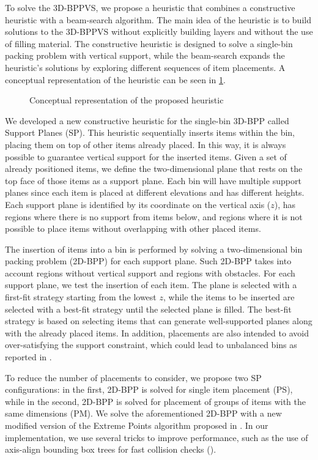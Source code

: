 \documentclass[11pt,a4paper,twocolumn]{article}
\begin{document}
To solve the 3D-BPPVS, we propose a heuristic that combines a constructive heuristic with a beam-search algorithm.
The main idea of the heuristic is to build solutions to the 3D-BPPVS without explicitly building layers and without the use of filling material.
The constructive heuristic is designed to solve a single-bin packing problem with vertical support, while the beam-search expands the heuristic's solutions by exploring different sequences of item placements.
A conceptual representation of the heuristic can be seen in \cref{fig:heur_scheme}.
\begin{figure}[h]
    \resizebox{\columnwidth}{!}{%
    
    }
    \caption{Conceptual representation of the proposed heuristic}
    \label{fig:heur_scheme}
\end{figure}


We developed a new constructive heuristic for the single-bin 3D-BPP called Support Planes (SP).
This heuristic sequentially inserts items within the bin, placing them on top of other items already placed.
In this way, it is always possible to guarantee vertical support for the inserted items.
Given a set of already positioned items, we define the two-dimensional plane that rests on the top face of those items as a support plane. Each bin will have multiple support planes since each item is placed at different elevations and has different heights. Each support plane is identified by its coordinate on the vertical axis ($z$), has regions where there is no support from items below, and regions where it is not possible to place items without overlapping with other placed items.

The insertion of items into a bin is performed by solving a two-dimensional bin packing problem (2D-BPP) for each support plane. 
Such 2D-BPP takes into account regions without vertical support and regions with obstacles.
For each support plane, we test the insertion of each item. The plane is selected with a first-fit strategy starting from the lowest $z$, while the items to be inserted are selected with a best-fit strategy until the selected plane is filled.
The best-fit strategy is based on selecting items that can generate well-supported planes along with the already placed items. In addition, placements are also intended to avoid over-satisfying the support constraint, which could lead to unbalanced bins as reported in \cite{elhedhli2019three}.

To reduce the number of placements to consider, we propose two SP configurations: in the first, 2D-BPP is solved for single item placement (PS), while in the second, 2D-BPP is solved for placement of groups of items with the same dimensions (PM).
We solve the aforementioned 2D-BPP with a new modified version of the Extreme Points algorithm proposed in \cite{crainic2008extreme}.
In our implementation, we use several tricks to improve performance, such as the use of axis-align bounding box trees for fast collision checks (\cite{bergen1997efficient}).
\end{document}
